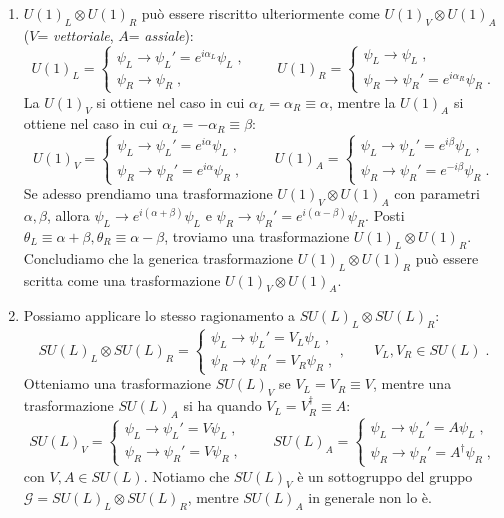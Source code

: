 \documentclass[12pt,a4paper]{article}
\theoremstyle{definition}
\newcommand{\adj}[1]{#1^{\dagger}}
\numberwithin{equation}{section}
\begin{document}
\begin{enumerate}
\item $U(1)_L\otimes U(1)_R$ può essere riscritto ulteriormente come $U(1)_V\otimes U(1)_A$ ($V$= \emph{vettoriale}, $A$= \emph{assiale}):
$$
U(1)_L=\begin{cases}
\psi_L\to \psi_L'=e^{i\alpha_L}\psi_L\;, \\
\psi_R\to\psi_R\;,
\end{cases} \qquad
U(1)_R=\begin{cases}
\psi_L\to \psi_L\;, \\
\psi_R\to\psi_R'=e^{i\alpha_R}\psi_R\;.
\end{cases}
$$
La $U(1)_V$ si ottiene nel caso in cui $\alpha_L=\alpha_R\equiv \alpha$, mentre la $U(1)_A$ si ottiene nel caso in cui $\alpha_L=-\alpha_R\equiv\beta$:
$$
U(1)_V=\begin{cases}
\psi_L\to\psi_L'=e^{i\alpha}\psi_L\;, \\
\psi_R\to\psi_R'=e^{i\alpha}\psi_R\;,
\end{cases} \qquad
U(1)_A=\begin{cases}
\psi_L\to\psi_L'=e^{i\beta}\psi_L\;, \\
\psi_R\to\psi_R'=e^{-i\beta}\psi_R\;.
\end{cases}
$$
Se adesso prendiamo una trasformazione $U(1)_V\otimes U(1)_A$ con parametri $\alpha,\beta$, allora $\psi_L\to e^{i(\alpha+\beta)}\psi_L$ e $\psi_R\to\psi_R'=e^{i(\alpha-\beta)}\psi_R$. Posti $\theta_L\equiv \alpha+\beta,\theta_R\equiv\alpha-\beta$, troviamo una trasformazione $U(1)_L\otimes U(1)_R$. Concludiamo che la generica trasformazione $U(1)_L\otimes U(1)_R$ può essere scritta come una trasformazione $U(1)_V\otimes U(1)_A$.
\item Possiamo applicare lo stesso ragionamento a $SU(L)_L\otimes SU(L)_R$:
$$
SU(L)_L\otimes SU(L)_R=\begin{cases}
\psi_L\to\psi_L'=V_L\psi_L\;, \\
\psi_R\to\psi_R'=V_R\psi_R\;,
\end{cases},\qquad V_L,V_R\in SU(L)\;.
$$
Otteniamo una trasformazione $SU(L)_V$ se $V_L=V_R\equiv V$, mentre una trasformazione $SU(L)_A$ si ha quando $V_L=\adj{V}_R\equiv A$:
\begin{equation}
SU(L)_V=\begin{cases}
\psi_L\to\psi_L'=V\psi_L \;,\\
\psi_R\to\psi_R'=V\psi_R\;,
\end{cases} \qquad
SU(L)_A=\begin{cases}
\psi_L\to\psi_L'=A\psi_L\;, \\
\psi_R\to\psi_R'=\adj{A}\psi_R\;,
\end{cases}
\end{equation}
con $V,A\in SU(L)$. Notiamo che $SU(L)_V$ è un sottogruppo del gruppo $\mathcal{G}=SU(L)_L\otimes SU(L)_R$, mentre $SU(L)_A$ in generale non lo è.
\end{enumerate}
\end{document}
